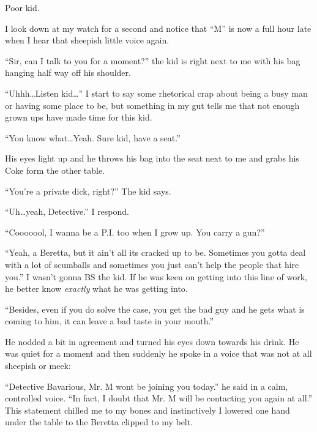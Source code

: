 Poor kid.



I look down at my watch for a second and notice that ``M'' is now a
full hour late when I hear that sheepish little voice again.



``Sir, can I talk to you for a moment?'' the kid is right next to me
with his bag hanging half way off his shoulder.



``Uhhh{\ldots}Listen kid{\ldots}'' I start to say some rhetorical crap about
being a busy man or having some place to be, but something in my
gut tells me that not enough grown ups have made time for this
kid.



``You know what{\ldots}Yeah. Sure kid, have a seat.''

His eyes light up and he throws his bag into the seat next to me
and grabs his Coke form the other table.



``You're a private dick, right?'' The kid says.



``Uh{\ldots}yeah, Detective.'' I respond.



``Cooooool, I wanna be a P.I. too when I grow up. You carry a
gun?''



``Yeah, a Beretta, but it ain't all its cracked up to be. Sometimes
you gotta deal with a lot of scumballs and sometimes you just can't
help the people that hire you.'' I wasn't gonna BS the kid. If he
was keen on getting into this line of work, he better know
{\em exactly} what he was getting into.



``Besides, even if you do solve the case, you get the bad guy and he
gets what is coming to him, it can leave a bad taste in your
mouth.''



He nodded a bit in agreement and turned his eyes down towards his
drink. He was quiet for a moment and then suddenly he spoke in a
voice that was not at all sheepish or meek:



``Detective Bavarious, Mr. M wont be joining you today.'' he said in
a calm, controlled voice. ``In fact, I doubt that Mr. M will be
contacting you again at all.'' This statement chilled me to my bones
and instinctively I lowered one hand under the table to the Beretta
clipped to my belt.



